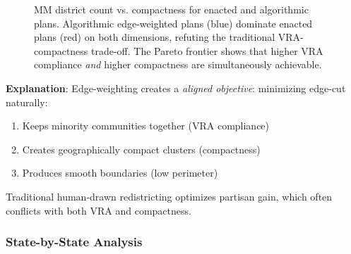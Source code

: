 \begin{figure}[h]
\centering
{}
\caption{MM district count vs. compactness for enacted and algorithmic plans. Algorithmic edge-weighted plans (blue) dominate enacted plans (red) on both dimensions, refuting the traditional VRA-compactness trade-off. The Pareto frontier shows that higher VRA compliance \textit{and} higher compactness are simultaneously achievable.}
\label{fig:compactness-vra-tradeoff}
\end{figure}

\textbf{Explanation}: Edge-weighting creates a \textit{aligned objective}: minimizing edge-cut naturally:
\begin{enumerate}
    \item Keeps minority communities together (VRA compliance)
    \item Creates geographically compact clusters (compactness)
    \item Produces smooth boundaries (low perimeter)
\end{enumerate}

Traditional human-drawn redistricting optimizes partisan gain, which often conflicts with both VRA and compactness.

\subsubsection{State-by-State Analysis}

